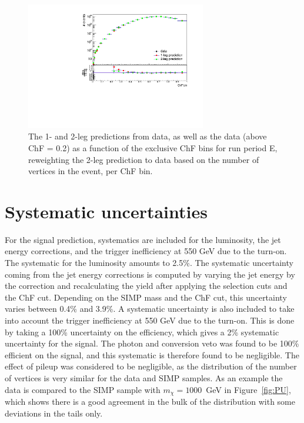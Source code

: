 \begin{figure}[h]
  \centering
  \includegraphics[width=0.7\textwidth]{figures/data_vs_prediction_RunE_reweighted_exclusivebinning.pdf}\hfill%
  \caption{The 1- and 2-leg predictions from data, as well as the data (above ChF = 0.2) as a function of the exclusive ChF bins for run period E, reweighting the 2-leg prediction to data based on the number of vertices in the event, per ChF bin.}
  \label{fig:BF_reweighted}
\end{figure}

\section{Systematic uncertainties}

For the signal prediction, systematics are included for the luminosity, the jet energy corrections, and the trigger inefficiency at 550 GeV due to the turn-on. The systematic for the luminosity amounts to 2.5\%. The systematic uncertainty coming from the jet energy corrections is computed by varying the jet energy by the correction and recalculating the yield after applying the selection cuts and the ChF cut. Depending on the SIMP mass and the ChF cut, this uncertainty varies between 0.4\% and 3.9\%. A systematic uncertainty is also included to take into account the trigger inefficiency at 550 GeV due to the turn-on. This is done by taking a 100\% uncertainty on the efficiency, which gives a 2\% systematic uncertainty for the signal. The photon and conversion veto was found to be 100\% efficient on the signal, and this systematic is therefore found to be negligible. 
The effect of pileup was considered to be negligible, as the distribution of the number of vertices is very similar for the data and SIMP samples. As an example the data is compared to the SIMP sample with $m_{\chi} = 1000$~GeV in Figure~\ref{fig:PU}, which shows there is a good agreement in the bulk of the distribution with some deviations in the tails only.

